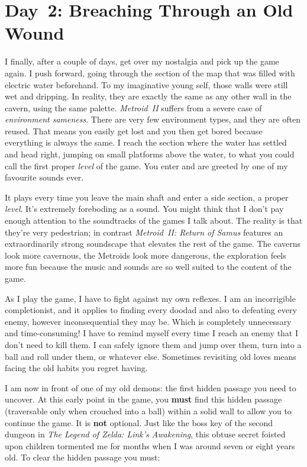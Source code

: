 \documentclass{book}
\begin{document}
\FloatBarrier\needspace{10mm}\section*{Day 2: Breaching Through an Old Wound}\nopagebreak[4]

I finally, after a couple of days, get over my nostalgia and pick up the game again. I push forward, going through the section of the map that was filled with electric water beforehand. To my imaginative young self, those walls were still wet and dripping. In reality, they are exactly the same as any other wall in the cavern, using the same palette. \emph{Metroid II} suffers from a severe case of \emph{environment sameness}. There are very few environment types, and they are often reused. That means you easily get lost and you then get bored because everything is always the same. I reach the section where the water has settled and head right, jumping on small platforms above the water, to what you could call the first proper \emph{level} of the game. You enter and are greeted by one of my favourite sounds ever.



It plays every time you leave the main shaft and enter a side section, a proper \emph{level}. It’s extremely foreboding as a sound. You might think that I don’t pay enough attention to the soundtracks of the games I talk about. The reality is that they’re very pedestrian; in contrast \emph{Metroid II: Return of Samus} features an extraordinarily strong soundscape that elevates the rest of the game. The caverns look more cavernous, the Metroids look more dangerous, the exploration feels more fun because the music and sounds are so well suited to the content of the game.

As I play the game, I have to fight against my own reflexes. I am an incorrigible completionist, and it applies to finding every doodad and also to defeating every enemy, however inconsequential they may be. Which is completely unnecessary and time-consuming! I have to remind myself every time I reach an enemy that I don’t need to kill them. I can safely ignore them and jump over them, turn into a ball and roll under them, or whatever else. Sometimes revisiting old loves means facing the old habits you regret having.

I am now in front of one of my old demons: the first hidden passage you need to uncover. At this early point in the game, you \textbf{must} find this hidden passage (traversable only when crouched into a ball) within a solid wall to allow you to continue the game. It is \textbf{not} optional. Just like the boss key of the second dungeon in \emph{The Legend of Zelda: Link’s Awakening}, this obtuse secret foisted upon children tormented me for months when I was around seven or eight years old. To clear the hidden passage you must:
\end{document}
